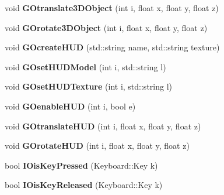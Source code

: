 \begin{DoxyCompactItemize}
\item 
\hypertarget{class_i_s_e_a3bc1cf01e12a531bc6947a6683d44647}{void {\bfseries G\-Otranslate3\-D\-Object} (int i, float x, float y, float z)}\label{class_i_s_e_a3bc1cf01e12a531bc6947a6683d44647}

\item 
\hypertarget{class_i_s_e_a0d81cfe1ecae75769d1b4c9be2b8782c}{void {\bfseries G\-Orotate3\-D\-Object} (int i, float x, float y, float z)}\label{class_i_s_e_a0d81cfe1ecae75769d1b4c9be2b8782c}

\item 
\hypertarget{class_i_s_e_a30ee9e809cae19ce4b27f374b661194a}{void {\bfseries G\-Ocreate\-H\-U\-D} (std\-::string name, std\-::string texture)}\label{class_i_s_e_a30ee9e809cae19ce4b27f374b661194a}

\item 
\hypertarget{class_i_s_e_a9cfdbcb7d771a266be56de7162c8826b}{void {\bfseries G\-Oset\-H\-U\-D\-Model} (int i, std\-::string l)}\label{class_i_s_e_a9cfdbcb7d771a266be56de7162c8826b}

\item 
\hypertarget{class_i_s_e_a6cc254ab083124145235f693b14405a5}{void {\bfseries G\-Oset\-H\-U\-D\-Texture} (int i, std\-::string l)}\label{class_i_s_e_a6cc254ab083124145235f693b14405a5}

\item 
\hypertarget{class_i_s_e_ae0d9089b4df165f944179c37f3e35b38}{void {\bfseries G\-Oenable\-H\-U\-D} (int i, bool e)}\label{class_i_s_e_ae0d9089b4df165f944179c37f3e35b38}

\item 
\hypertarget{class_i_s_e_ab342208e1436b0e9f456434c65d7b96c}{void {\bfseries G\-Otranslate\-H\-U\-D} (int i, float x, float y, float z)}\label{class_i_s_e_ab342208e1436b0e9f456434c65d7b96c}

\item 
\hypertarget{class_i_s_e_ae0dc006a24643cc17ca2ab407836822c}{void {\bfseries G\-Orotate\-H\-U\-D} (int i, float x, float y, float z)}\label{class_i_s_e_ae0dc006a24643cc17ca2ab407836822c}

\item 
\hypertarget{class_i_s_e_a5c48de8d0d22cd4fa08f3ee5dca77eb9}{bool {\bfseries I\-Ois\-Key\-Pressed} (Keyboard\-::\-Key k)}\label{class_i_s_e_a5c48de8d0d22cd4fa08f3ee5dca77eb9}

\item 
\hypertarget{class_i_s_e_a0b650a4d6cc0fa8cd70f66be985f929b}{bool {\bfseries I\-Ois\-Key\-Released} (Keyboard\-::\-Key k)}\label{class_i_s_e_a0b650a4d6cc0fa8cd70f66be985f929b}


\end{DoxyCompactItemize}
